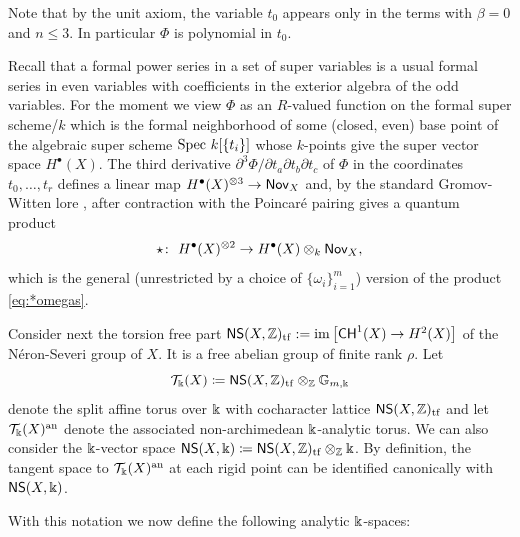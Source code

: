 \documentclass[twoside,leqno]{article}
\numberwithin{equation}{section}
\theoremstyle{plain}
\theoremstyle{definition}
\begin{document}
Note that by the unit axiom, the variable $t_0$ appears only in the terms with $\beta=0$ and $n \le 3$. In particular $\Phi$ is polynomial in $t_{0}$. 

Recall that a formal power series in a set of super variables is a usual formal series in even variables with coefficients in the exterior algebra of the odd variables. For the moment we  view $\Phi$ as an $R$-valued function on the formal super scheme/$k$ which is the formal neighborhood of some (closed, even) base point  of the algebraic super scheme 
$\operatorname{Spec} \, k[\{t_{i}\}]$ whose $k$-points give the super vector space $H^{\bullet}(X)$.  
The third derivative $\partial^3\Phi/\partial t_{a}\partial t_{b}\partial t_{c}$ of $\Phi$ in the coordinates $t_{0}, \ldots, t_{r}$
defines a linear map $H^{\bullet}(X)^{\otimes 3} \to \mathsf{Nov}_{X}$ and, by the standard Gromov-Witten lore \cite{Kontsevich_Gromov-Witten_classes},
after contraction with the Poincar\'{e} pairing gives a quantum product 
\[
\star \colon \ H^{\bullet}(X)^{\otimes 2} \to 
H^{\bullet}(X)\otimes_{k} \mathsf{Nov}_{X},
\]
which is the general (unrestricted by a choice of $\{\omega_{i}\}_{i = 1}^{m}$) version of the  product \eqref{eq:*omegas}. 

\medskip

Consider next the torsion free part $\mathsf{NS}(X,\mathbb Z)_{\operatorname{tf}} := 
\operatorname{im}\left[\mathsf{CH}^{1}(X) \to H^2(X)\right]$ of the N\'{e}ron-Severi group of $X$. It is a free abelian group of finite rank $\rho$. Let
\[
\mathcal{T}_{\Bbbk}(X) \coloneqq \mathsf{NS}(X,\mathbb Z)_{\operatorname{tf}}\otimes_{\mathbb Z} \mathbb{G}_{m,\Bbbk}
\]
denote the
split affine torus over $\Bbbk$ with cocharacter lattice $\mathsf{NS}(X,\mathbb Z)_{\operatorname{tf}}$ and let 
$\mathcal{T}_{\Bbbk}(X)^{\operatorname{an}}$ denote the associated non-archimedean $\Bbbk$-analytic torus. We can also consider the $\Bbbk$-vector space 
$\mathsf{NS}(X,\Bbbk) \coloneqq \mathsf{NS}(X,\mathbb Z)_{\operatorname{tf}}\otimes_{\mathbb Z} \Bbbk$. By definition, the tangent space to $\mathcal{T}_{\Bbbk}(X)^{\operatorname{an}}$ at each rigid point can be identified canonically with $\mathsf{NS}(X,\Bbbk)$.

\medskip

With this notation we now define the following analytic $\Bbbk$-spaces:
\end{document}
